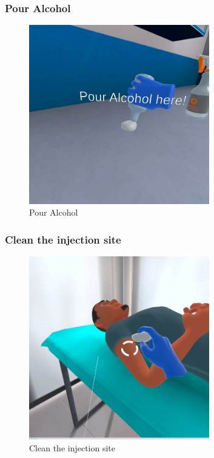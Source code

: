 \subsubsection{Pour Alcohol}
\begin{figure}[h]
	\centering
	\includegraphics[width=0.7\textwidth, height=0.3\textheight]{Images/Pour Alcohol.png}
	\caption{Pour Alcohol}
	\label{fig:Pour-Alcohol}
\end{figure}
\newpage
\subsubsection{Clean the injection site}
\begin{figure}[h]
	\centering
	\includegraphics[width=0.7\textwidth, height=0.3\textheight]{Images/Clean the injection site.png}
	\caption{Clean the injection site}
	\label{fig:Clean the injection site}
\end{figure}
